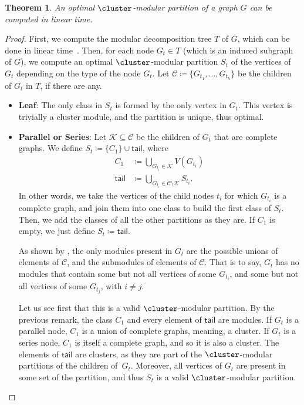\documentclass[11pt]{article}
\theoremstyle{plain}
\newtheorem{theorem}{Theorem}
\theoremstyle{definition}
\theoremstyle{remark}
\begin{document}
\begin{theorem}
\label{prop:calculate-cluster-module-partition}
    An optimal $\cluster$-modular partition of a graph $G$ can be computed in linear time.
\end{theorem}
\begin{proof}
\newcommand{\Shead}{C_1}
\newcommand{\Stail}{\mathsf{tail}}
First, we compute the modular decomposition tree $T$ of $G$, which can be done in linear time~\citep{modular-decomposition-linear-cournier,modular-decomposition-linear-mcconnell,modular-decomposition-linear}. Then, for each node $G_t \in T$ (which is an induced subgraph of $G$), we compute an optimal $\cluster$-modular partition $S_t$ of the vertices of $G_t$ depending on the type of the node $G_t$. Let $\mathcal{C} \coloneqq \{G_{t_1}, \dots, G_{t_h}\}$ be the children of $G_t$ in $T$, if there are any. 
    \begin{itemize}
        \item \textbf{Leaf}: The only class in $S_t$ is formed by the only vertex in $G_t$. This vertex is trivially a cluster module, and the partition is unique, thus optimal.
        \item \textbf{Parallel or Series}: Let $\mathcal{K} \subseteq \mathcal{C}$ be the children of $G_t$ that are complete graphs. We define $S_t \coloneqq \{\Shead\} \cup \Stail$, where
        \begin{align*}
            \Shead &\coloneqq \bigcup_{G_{t_i} \in \mathcal{K}} V(G_{t_i})\\
            \Stail &\coloneqq \bigcup_{G_{t_i} \in \mathcal{C} \setminus \mathcal{K}} S_{t_i}. 
        \end{align*}
        In other words, we take the vertices of the child nodes $t_i$ for which $G_{t_i}$ is a complete graph, and join them into one class to build the first class of $S_t$. Then, we add the classes of all the other partitions as they are. If $\Shead$ is empty, we just define $S_t \coloneqq \Stail$.

        As shown by \citet{modular-decomposition}, the only modules present in $G_t$ are the possible unions of elements of $\mathcal{C}$, and the submodules of elements of $\mathcal{C}$. That is to say, $G_t$ has no modules that contain some but not all vertices of some $G_{t_i}$, and some but not all vertices of some $G_{t_j}$, with $i \neq j$.

        Let us see first that this is a valid $\cluster$-modular partition. By the previous remark, the class $\Shead$ and every element of $\Stail$ are modules. If $G_t$ is a parallel node, $\Shead$ is a union of complete graphs, meaning, a cluster. If $G_t$ is a series node, $\Shead$ is itself a complete graph, and so it is also a cluster. The elements of $\Stail$ are clusters, as they are part of the $\cluster$-modular partitions of the children of~$G_t$. Moreover, all vertices of $G_t$ are present in some set of the partition, and thus $S_t$ is a valid $\cluster$-modular partition.


\end{itemize}
\end{proof}
\end{document}
